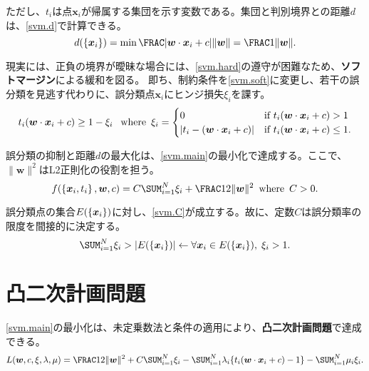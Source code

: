 \documentclass[10pt,a4paper]{book}
\begin{document}
ただし、$t_i$は点$\bm{x}_i$が帰属する集団を示す変数である。集団と判別境界との距離$d$は、\eqref{svm.d}で計算できる。
%
\begin{equation}
\label{eq:svm.d}
d(\seq{\bm{x}_i}) = \min\frac{|\dprod{\bm{w}}{\bm{x}_i} + c|}{\|\bm{w}\|} = \frac{1}{\|\bm{w}\|}.
\end{equation}

現実には、正負の境界が曖昧な場合には、\eqref{svm.hard}の遵守が困難なため、\textbf{ソフトマージン}による緩和を図る。
即ち、制約条件を\eqref{svm.soft}に変更し、若干の誤分類を見逃す代わりに、誤分類点$\bm{x}_i$にヒンジ損失$\xi_i$を課す。
%
\begin{equation}
\label{eq:svm.soft}
t_i (\bm{w} \cdot \bm{x}_i + c) \geq 1 - \xi_i\;
\enspace\mathrm{where}\enspace \xi_i =
\begin{cases}
0 & \text{if $t_i(\bm{w} \cdot \bm{x}_i + c) > 1$} \\
|t_i - (\bm{w} \cdot \bm{x}_i + c)| & \text{if $t_i(\bm{w} \cdot \bm{x}_i + c) \leq 1$}.
\end{cases}
\end{equation}

誤分類の抑制と距離$d$の最大化は、\eqref{svm.main}の最小化で達成する。ここで、$\|\bm{w}\|^2$はL2正則化の役割を担う。
%
\begin{equation}
\label{eq:svm.main}
f(\seq{\bm{x}_i,t_i}, \bm{w}, c) = C \sum_{i=1}^N \xi_i + \frac{1}{2}\|\bm{w}\|^2 \where C>0.
\end{equation}

誤分類点の集合$E(\seq{\bm{x}_i})$に対し、\eqref{svm.C}が成立する。故に、定数$C$は誤分類率の限度を間接的に決定する。
%
\begin{equation}
\label{eq:svm.C}
\sum_{i=1}^N \xi_i > |E(\seq{\bm{x}_i})|
\leftarrow
\forall \bm{x}_i \in E(\seq{\bm{x}_i}),\;\xi_i>1.
\end{equation}

\section{凸二次計画問題\label{sect:svm.smo}}

\eqref{svm.main}の最小化は、未定乗数法と\KKT 条件の適用により、\textbf{凸二次計画問題}で達成できる。
%
\begin{equation}
\label{eq:svm.L}
L(\bm{w},c,\xi,\lambda,\mu)
= \frac{1}{2}\|\bm{w}\|^2 +C \sum_{i=1}^N \xi_i - \sum_{i=1}^N \lambda_i \{t_i(\dprod{\bm{w}}{\bm{x}_i} + c) - 1\} - \sum_{i=1}^N \mu_i \xi_i.
\end{equation}
\end{document}
